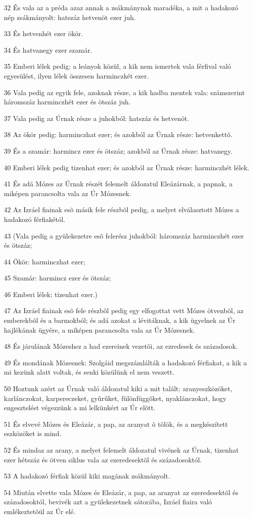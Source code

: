 \par 32 És vala az a préda azaz annak a zsákmánynak maradéka, a mit a hadakozó nép zsákmányolt: hatszáz hetvenöt ezer juh.
\par 33 És hetvenhét ezer ökör.
\par 34 És hatvanegy ezer szamár.
\par 35 Emberi lélek pedig: a leányok közül, a kik nem ismertek vala férfival való egyesülést, ilyen lélek összesen harminczkét ezer.
\par 36 Vala pedig az egyik fele, azoknak része, a kik hadba mentek vala: számszerint háromszáz harminczhét ezer és ötszáz juh.
\par 37 Vala pedig az Úrnak része a juhokból: hatszáz és hetvenöt.
\par 38 Az ökör pedig: harminczhat ezer; és azokból az Úrnak része: hetvenkettõ.
\par 39 És a szamár: harmincz ezer és ötszáz; azokból az Úrnak része: hatvanegy.
\par 40 Emberi lélek pedig tizenhat ezer; és azokból az Úrnak része: harminczhét lélek.
\par 41 És adá Mózes az Úrnak részét felemelt áldozatul Eleázárnak, a papnak, a miképen parancsolta vala az Úr Mózesnek.
\par 42 Az Izráel fiainak esõ másik fele részbõl pedig, a melyet elválasztott Mózes a hadakozó férfiakétól.
\par 43 (Vala pedig a gyülekezetre esõ felerész juhokból: háromszáz harminczhét ezer és ötszáz;
\par 44 Ökör: harminczhat ezer;
\par 45 Szamár: harmincz ezer és ötszáz;
\par 46 Emberi lélek: tizenhat ezer.)
\par 47 Az Izráel fiainak esõ fele részbõl pedig egy elfogottat vett Mózes ötvenbõl, az emberekbõl és a barmokból; és adá azokat a lévitáknak, a kik ügyelnek az Úr hajlékának ügyére, a miképen parancsolta vala az Úr Mózesnek.
\par 48 És járulának Mózeshez a had ezereinek vezetõi, az ezredesek és századosok.
\par 49 És mondának Mózesnek: Szolgáid megszámlálták a hadakozó férfiakat, a kik a mi kezünk alatt voltak, és senki közülünk el nem veszett.
\par 50 Hoztunk azért az Úrnak való áldozatul kiki a mit talált: aranyeszközöket, karlánczokat, karpereczeket, gyûrûket, fülönfüggõket, nyaklánczokat, hogy engesztelést végezzünk a mi lelkünkért az Úr elõtt.
\par 51 És elvevé Mózes és Eleázár, a pap, az aranyat õ tõlök, és a megkészített eszközöket is mind.
\par 52 És mindaz az arany, a melyet felemelt áldozatul vivének az Úrnak, tizenhat ezer hétszáz és ötven siklus vala az ezeredesektõl és századosoktól.
\par 53 A hadakozó férfiak közül kiki magának zsákmányolt.
\par 54 Miután elvette vala Mózes és Eleázár, a pap, az aranyat az ezeredesektõl és századosoktól, bevivék azt a gyülekezetnek sátorába, Izráel fiaira való emlékeztetõül az Úr elé.

